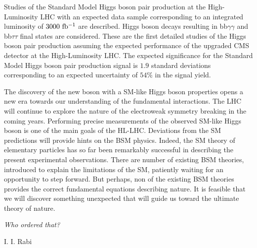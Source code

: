 Studies of the Standard Model Higgs boson pair production at the High-Luminosity LHC with an expected data sample corresponding to an integrated luminosity of $3000~\mathrm{fb^{-1}}$ are described. Higgs boson decays resulting in bb$\gamma\gamma$ and bb$\tau\tau$ final states are considered. These are the first detailed studies of the Higgs boson pair production assuming the expected performance of the upgraded CMS detector at the High-Luminosity LHC. The expected significance for the Standard Model Higgs boson pair production signal is $1.9$ standard deviations corresponding to an expected uncertainty of $54\%$ in the signal yield. 

The discovery of the new boson with a SM-like Higgs boson properties opens a new era towards our understanding of the fundamental interactions. The LHC will continue to explore the nature of the electroweak symmetry breaking in the coming years. Performing precise measurements of the observed SM-like Higgs boson is one of the main goals of the HL-LHC. Deviations from the SM predictions will provide hints on the BSM physics. Indeed, the SM theory of elementary particles has so far been remarkably successful in describing the present experimental observations. There are number of existing BSM theories, introduced to explain the limitations of the SM, patiently waiting for an opportunity to step forward. But perhaps, non of the existing BSM theories provides the correct fundamental equations describing nature. It is feasible that we will discover something unexpected that will guide us toward the ultimate theory of nature.

\epigraph{\textit{Who ordered that?}}{I. I. Rabi}



